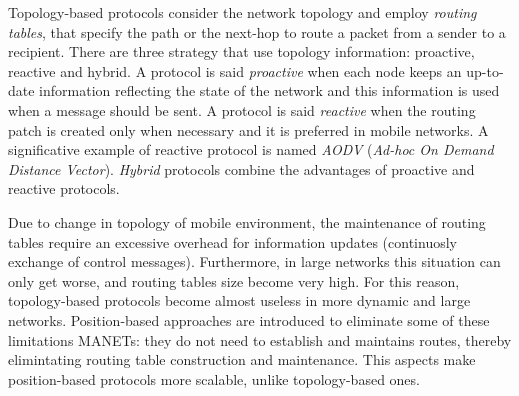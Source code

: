\documentclass[journal,comsoc]{IEEEtran}
\begin{document}
\par Topology-based protocols consider the network topology and employ \emph{routing tables}, that specify the path or the next-hop to route a packet from a sender to a recipient. There are three strategy that use topology information: proactive, reactive and hybrid. A protocol is said \emph{proactive} when each node keeps an up-to-date information reflecting the state of the network and this information is used when a message should be sent. A protocol is said \emph{reactive} when the routing patch is created only when necessary and it is preferred in mobile networks. A significative example of reactive protocol is named \emph{AODV} (\emph{Ad-hoc On Demand Distance Vector}). \emph{Hybrid} protocols combine the advantages of proactive and reactive protocols.
\par Due to change in topology of mobile environment, the maintenance of routing tables require an excessive overhead for information updates (continuosly exchange of control messages). Furthermore, in large networks this situation can only get worse, and routing tables size become very high. For this reason, topology-based protocols become almost useless in more dynamic and large networks. Position-based approaches are introduced to eliminate some of these limitations MANETs: they do not need to establish and maintains routes, thereby elimintating routing table construction and maintenance. This aspects make position-based protocols more scalable, unlike topology-based ones.
\end{document}

